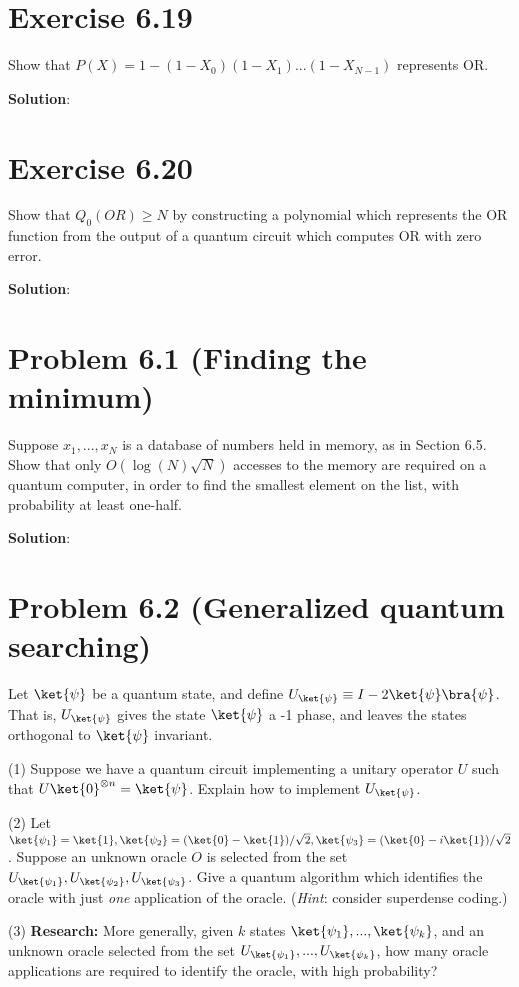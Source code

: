 \documentclass{book}
\begin{document}
\section*{Exercise 6.19}
    Show that $P(X) = 1-(1-X_0)(1-X_1)...(1-X_{N-1})$ represents OR. 
    
    \textbf{Solution}:

\section*{Exercise 6.20}
    Show that $Q_0(OR)\geq N$ by constructing a polynomial which represents the OR function from the output of a quantum circuit which computes OR with zero error.

    \textbf{Solution}:

\section*{Problem 6.1 (Finding the minimum)}
    Suppose $x_1,...,x_N$ is a database of numbers held in memory, as in Section 6.5. Show that only $O(\log(N)\sqrt{N})$ accesses to the memory are required on a quantum computer, in order to find the smallest element on the list, with probability at least one-half. 
    
    \textbf{Solution}:

\section*{Problem 6.2 (Generalized quantum searching)}
    Let $\ket{\psi}$ be a quantum state, and define $U_{\ket{\psi}}\equiv I - 2\ket{\psi}\bra{\psi}$. That is, $U_{\ket{\psi}}$ gives the state $\ket{\psi}$ a -1 phase, and leaves the states orthogonal to $\ket{\psi}$ invariant. \par
    
    (1) Suppose we have a quantum circuit implementing a unitary operator $U$ such that $U\ket{0}^{\otimes n} = \ket{\psi}$. Explain how to implement $U_{\ket{\psi}}$. \par
    (2) Let $\ket{\psi_1}=\ket{1}, \ket{\psi_2} = (\ket{0}-\ket{1})/\sqrt{2}, \ket{\psi_3}=(\ket{0}-i\ket{1})/\sqrt{2}$. Suppose an unknown oracle $O$ is selected from the set $U_{\ket{\psi_1}}, U_{\ket{\psi_2}}, U_{\ket{\psi_3}}$. Give a quantum algorithm which identifies the oracle with just \emph{one} application of the oracle. (\emph{Hint}: consider superdense coding.) \par
    (3) \textbf{Research:} More generally, given $k$ states $\ket{\psi_1},...,\ket{\psi_k}$, and an unknown oracle selected from the set $U_{\ket{\psi_1}},...,U_{\ket{\psi_k}}$, how many oracle applications are required to identify the oracle, with high probability?
    
\end{document}
